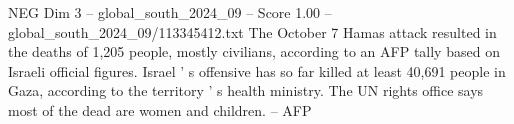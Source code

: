 \begin{textsample}{NEG Dim 3 – global\_south\_2024\_09 – Score 1.00 – global\_south\_2024\_09/113345412.txt}
The October 7 Hamas attack resulted in the deaths of 1,205 people, mostly civilians, according to an AFP tally based on Israeli official figures.
Israel ' s offensive has so far killed at least 40,691 people in Gaza, according to the territory ' s health ministry.
The UN rights office says most of the dead are women and children. -- AFP

\end{textsample}
